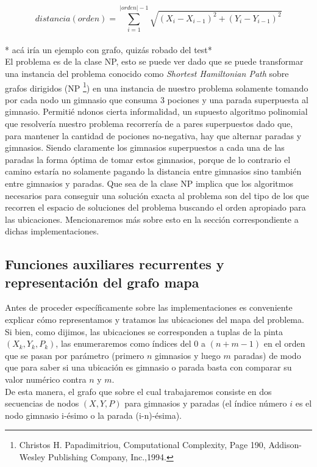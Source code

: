    $$ distancia(orden) = \sum_{i=1}^{|orden|-1} \sqrt{(X_i - X_{i-1})^2 + (Y_i - Y_{i-1})^2} $$
   \\

   {\color{red}* acá iría un ejemplo con grafo, quizás robado del test*}
   \\

   El problema es de la clase NP, esto se puede ver dado que se puede transformar una instancia del problema conocido como \emph{Shortest Hamiltonian Path} sobre grafos dirigidos (NP \footnote{Christos H. Papadimitriou, Computational Complexity, Page 190, Addison-Wesley Publishing Company, Inc.,1994.}) en una instancia de nuestro problema solamente tomando por cada nodo un gimnasio que consuma 3 pociones y una parada superpuesta al gimnasio. Permitié ndonos cierta informalidad, un supuesto algoritmo polinomial que resolvería nuestro problema recorrería de a pares superpuestos dado que, para mantener la cantidad de pociones no-negativa, hay que alternar paradas y gimnasios. Siendo claramente los gimnasios superpuestos a cada una de las paradas la forma óptima de tomar estos gimnasios, porque de lo contrario el camino estaría no solamente pagando la distancia entre gimnasios sino también entre gimnasios y paradas. Que sea de la clase NP implica que los algoritmos necesarios para conseguir una solución exacta al problema son del tipo de los que recorren el espacio de soluciones del problema buscando el orden apropiado para las ubicaciones. Mencionaremos más sobre esto en la sección correspondiente a dichas implementaciones.

   \subsection{Funciones auxiliares recurrentes y representación del grafo mapa}

   Antes de proceder específicamente sobre las implementaciones es conveniente explicar cómo representamos y tratamos las ubicaciones del mapa del problema. Si bien, como dijimos, las ubicaciones se corresponden a tuplas de la pinta $(X_k, Y_k, P_k)$, las enumeraremos como índices del 0 a $(n + m - 1)$ en el orden que se pasan por parámetro (primero $n$ gimnasios y luego $m$ paradas) de modo que para saber si una ubicación es gimnasio o parada basta con comparar su valor numérico contra $n$ y $m$.
   \\

   De esta manera, el grafo que sobre el cual trabajaremos consiste en dos secuencias de nodos $(X, Y, P)$ para gimnasios y paradas (el índice número $i$ es el nodo gimnasio i-ésimo o la parada (i-n)-ésima).
   \\

